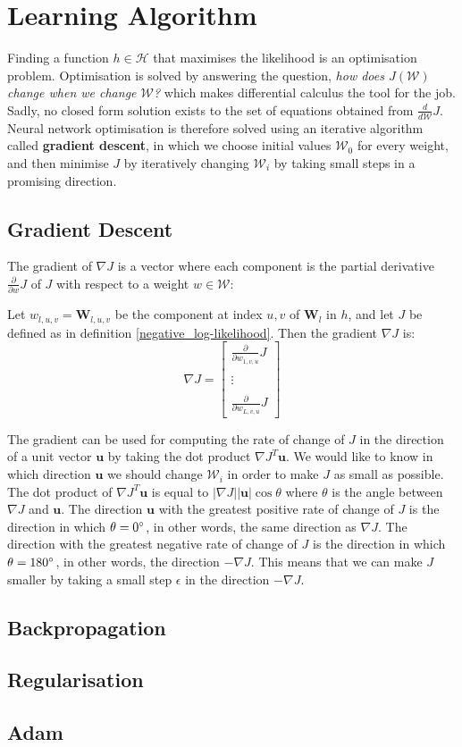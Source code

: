 \section{Learning Algorithm}
\label{learning_algorithm}
Finding a function $h \in \mathcal{H}$ that maximises the likelihood is an optimisation problem. Optimisation is solved by answering the question, \textit{how does $J(\mathcal{W})$ change when we change $\mathcal{W}$?} which makes differential calculus the tool for the job. Sadly, no closed form solution exists to the set of equations obtained from $\frac{d}{d\mathcal{W}}J$. Neural network optimisation is therefore solved using an iterative algorithm called \textbf{gradient descent}, in which we choose initial values $\mathcal{W}_0$ for every weight, and then minimise $J$ by iteratively changing $\mathcal{W}_i$ by taking small steps in a promising direction.

\subsection{Gradient Descent}
\label{gradient_descent}
The gradient of $\nabla J$ is a vector where each component is the partial derivative $\frac{\partial}{\partial w}J$ of $J$ with respect to a weight $w \in \mathcal{W}$:

\begin{definition}[gradient]
	\label{gradient}
	Let $w_{l,u,v} = \mathbf{W}_{l,u,v}$ be the component at index $u,v$ of $\mathbf{W}_l$ in $h$, and let $J$ be defined as in definition \ref{negative_log-likelihood}. Then the gradient $\nabla J$ is:
	$$
	\nabla J = \begin{bmatrix} \frac{\partial}{\partial w_{1,v,u}}J \\ \\ \vdots \\ \\ \frac{\partial}{\partial w_{L,v,u}}J\end{bmatrix}
	$$
\end{definition}
The gradient can be used for computing the rate of change of $J$ in the direction of a unit vector $\mathbf{u}$ by taking the dot product $\nabla J^T\mathbf{u}$. We would like to know in which direction $\mathbf{u}$ we should change $\mathcal{W}_i$ in order to make $J$ as small as possible. The dot product of $\nabla J^T\mathbf{u}$ is equal to $|\nabla J||\mathbf{u}|\cos \theta$ where $\theta$ is the angle between $\nabla J$ and $\mathbf{u}$. The direction $\mathbf{u}$ with the greatest positive rate of change of $J$ is the direction in which $\theta = 0\degree$, in other words, the same direction as $\nabla J$. The direction with the greatest negative rate of change of $J$ is the direction in which $\theta = 180\degree$, in other words, the direction $-\nabla J$. This means that we can make $J$ smaller by taking a small step $\epsilon$ in the direction $-\nabla J$.

\subsection{Backpropagation}
\subsection{Regularisation}
\label{early_stopping}
\subsection{Adam}